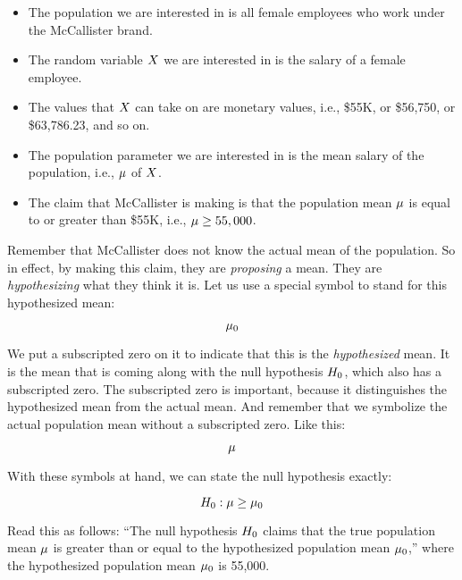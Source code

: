 \documentclass[../../../main.tex]{subfiles}
\begin{document}
\begin{itemize}
  \item The population we are interested in is all female employees who work under the McCallister brand.
  \item The random variable $\RandVar/$ we are interested in is the salary of a female employee.
  \item The values that $\RandVar/$ can take on are monetary values, i.e., \$55K, or \$56,750, or \$63,786.23, and so on.
  \item The population parameter we are interested in is the mean salary of the population, i.e., $\mu$ of $\RandVar/$.
  \item The claim that McCallister is making is that the population mean $\mu$ is equal to or greater than \$55K, i.e., $\mu \geq 55,000$.
\end{itemize}

\noindent
Remember that McCallister does not know the actual mean of the population. So in effect, by making this claim, they are \emph{proposing} a mean. They are \emph{hypothesizing} what they think it is. Let us use a special symbol to stand for this hypothesized mean:

\begin{equation*}
  \HypPopMean/
\end{equation*}

\noindent
We put a subscripted zero on it to indicate that this is the \emph{hypothesized} mean. It is the mean that is coming along with the null hypothesis $\NullHyp/$, which also has a subscripted zero. The subscripted zero is important, because it distinguishes the hypothesized mean from the actual mean. And remember that we symbolize the actual population mean without a subscripted zero. Like this:

\begin{equation*}
  \mu
\end{equation*}

\noindent
With these symbols at hand, we can state the null hypothesis exactly:

\begin{equation*}
  \NullHyp/: \populationmean \geq \HypPopMean/
\end{equation*}

\noindent
Read this as follows: ``The null hypothesis $\NullHyp/$ claims that the true population mean $\mu$ is greater than or equal to the hypothesized population mean $\HypPopMean/$,'' where the hypothesized population mean $\HypPopMean/$ is 55,000.
\end{document}
